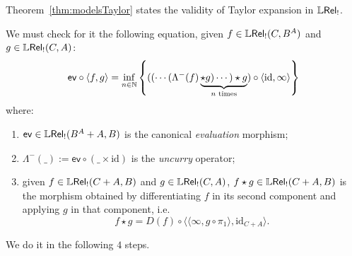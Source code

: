 Theorem~\ref{thm:modelsTaylor} states the validity of Taylor expansion in $\mathbb{L} \mathsf{Rel}_!$.

We must check for it the following equation, given $f\in \mathbb{L} \mathsf{Rel}_!(C, B^{A})$ and $g\in \mathbb{L} \mathsf{Rel}_!(C,A)$:
$$
\mathsf{ev}\circ \langle f,g\rangle= \inf_{n\in \mathbb{N}}
\left\{(( \cdots (\Lambda^{-}(f) \underbrace{\star g)\cdots )\star g}_{n\text{ times}})\circ \langle \mathrm{id}, \infty\rangle\right\}
$$
where:
\begin{enumerate}
\item $\mathsf{ev}\in \mathbb{L} \mathsf{Rel}_!(B^{A}+A, B)$ is the canonical \emph{evaluation} morphism;

\item $\Lambda^{-}(\_):= \mathsf{ev}\circ (\_\times \mathrm{id})$ is the \emph{uncurry} operator;

\item given $f\in \mathbb{L} \mathsf{Rel}_!(C+A,B)$ and $g\in \mathbb{L} \mathsf{Rel}_!(C,A)$, 
$f\star g\in \mathbb{L} \mathsf{Rel}_!(C+A,B)$ is the morphism obtained by differentiating $f$ in its second component and applying $g$ in that component, i.e.~
$$
f\star g =  D(f)\circ \langle \langle \infty, g\circ \pi_{1}\rangle, \mathrm{id}_{C+A}\rangle.
$$ 

\end{enumerate}

We do it in the following $4$ steps.


